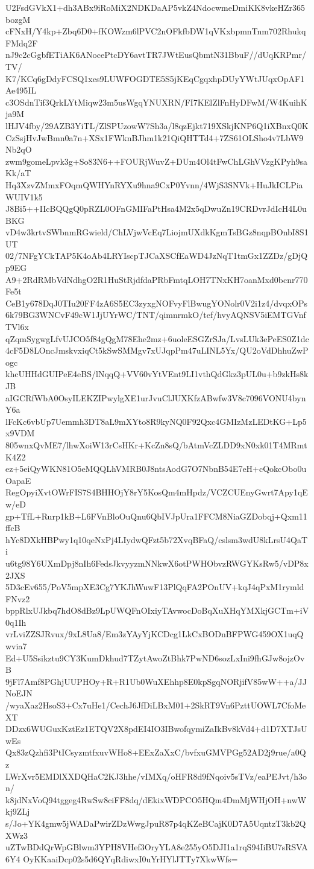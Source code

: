U2FsdGVkX1+dh3ABx9iRoMiX2NDKDaAP5vkZ4NdocwmeDmiKK8vkeHZr365bozgM
cFNxH/Y4kp+Zbq6D0+fKOWzm6lPVC2nOFkfbDW1qVKxbpmnTnm702RhukqFMdq2F
nJ9c2cGgbfETiAK6ANocePtcDY6avtTR7JWtEusQbmtN31BbuF//dUqKRPmr/TV/
K7/KCq6gDdyFCSQ1xes9LUWFOGDTE5S5jKEqCgqxhpDUyYWtJUqxOpAF1Ae495IL
c3OSdnTif3QrkLYtMiqw23m5usWgqYNUXRN/FI7KElZlFnHyDFwM/W4KuihKja9M
lHJV4fby/29AZB3YiTL/ZlSPUzowW7Sh3a/l8qzEjkt719XSkjKNP6Q1iXBnxQ0K
CzSsjHvJwBmn0a7n+XSx1FWknBJhm1k21QiQHTTd4+7ZS61OLSho4v7LbW9Nb2qO
zwm9gomeLpvk3g+So83N6++FOURjWuvZ+DUm4Ol4tFwChLGhVVzgKPyh9saKk/aT
Hq3XzvZMmxFOqmQWHYnRYXu9hna9CxP0Yvnn/4WjS3SNVk+HuJkICLPiaWUIV1k5
J8Bi5++IIcBQQgQ0pRZL0OFnGMIFaPtHsa4M2x5qDwuZn19CRDvrJdIcH4L0uBKG
vD4w3krtvSWbnmRGwield/ChLVjwVcEq7LiojmUXdkKgmTsBGz8nqpBOnbI8S1UT
02/7NFgYCkTAP5K4oAb4LRYIscpTJCaXSCfEaWD4JzNqT1tmGx1ZZDz/gDjQp9EG
A9+2RdRMbVdNdhgO2R1HuStRjdfdaPRbFmtqLOH7TNxKH7oanMxd0bcnr770Fe5t
CeB1y678DqJ0TIu20FF4zA6S5EC3zyxgNOFvyFlBwugYONolr0V2i1z4/dvqxOPs
6k79BG3WNCvF49cW1JjUYrWC/TNT/qimnrmkO/tef/hvyAQNSV5iEMTGVnfTVl6x
qZqmSygwgLfvUJCO5f84gQgM78Ehe2mz+6uoleESGZrSJa/LvsLUk3ePeES0Z1dc
4cF5D8LOncJmskvxiqCt5kSwSMMgv7xUJqpPm47uLINL5Yx/QU2oVdDhhuZwPogc
khcUHHdGUIPeE4eBS/lNqqQ+VV60vYtVEnt9LI1vthQdGkz3pUL0u+b9zkHs8kJB
aIGCRfWbA0OsyILEKZIPwylgXE1urJvuClJUXKfzABwfw3V8c7096VONU4bynY6a
lFcKc6vbUp7Uemmh3DT8aL9mXYto8R9kyNQ0F92Qxc4GMIzMzLEDtKG+Lp5x9VDM
805wnxQvME7/lhwXoiW13rCsHKr+KcZn8sQ/bAtmVcZLDD9xN0xk01T4MRmtK4Z2
ez+5eiQyWKN81O5eMQQLhVMRB0J8ntsAodG7O7NbnB54E7eH+cQokcObo0uOapaE
RegOpyiXvtOWrFIS7S4BHHOjY8rY5KosQm4mHpdz/VCZCUEnyGwrt7Apy1qEw/eD
gp+TfL+Rurp1kB+L6FVnBloOuQnu6QbIVJpUra1FFCM8NiaGZDobqj+Qxm11ffcB
hYc8DXkHBPwy1q10qeNxPj4LIydwQFzt5b72XvqBFaQ/cslsm3wdU8kLrsU4QaTi
u6tg98Y6UXmDpj8nIh6FedsJkvyyzmNNkwX6otPWHObvzRWGYKsRw5/vDP8x2JXS
5D3cEv655/PoV5mpXE3Cg7YKJhWuwF13PlQqFA2POnUV+kqJ4qPxM1rymldFNvz2
bppRlxUJkbq7hdO8dBz9LpUWQFnOIxiyTAvwocDoBqXuXHqYMXkjGCTm+iV0q1Ih
vrLviZZSJRvux/9xL8Ua8/Em3zYAyYjKCDcg1LkCxBODnBFPWG459OX1uqQwvia7
Ed+U5Ssikztu9CY3KumDkhud7TZytAwoZtBhk7PwND6sozLxIni9fhGJw8ojzOvB
9jFl7Amf8PGhjUUPHOy+R+R1Ub0WuXEhhp8E0kpSgqNORjifV85wW++a/JJNoEJN
/wyaXaz2HsoS3+Cx7uHe1/CechJ6JfDiLBxM01+2SkRT9Vn6PzttUOWL7CfoMeXT
DDzx6WUGuxKztEz1ETQV2X8pdEI4IO3IBwofqymiZaIkBv8kVd4+d1D7XTJsUwEs
Qx83zQzhfi3PtICsyzmtfxuvWHo8+EExZaXxC/bvfxuGMVPGg52AD2j9rue/a0Qz
LWrXvr5EMDlXXDQHaC2KJ3hhe/vIMXq/oHFR8d9fNqoiv5sTVz/eaPEJvt/h3on/
k8jdNxVoQ94tggeg4RwSw8ciFF8dq/dEkixWDPCO5HQm4DmMjWHjOH+nwWkj9ZLj
s/Jo+YK4gmw5jWADaPwirZDzWwgJpuR87p4qKZeBCajK0D7A5UqntzT3kb2QXWz3
uZTwBDdQrWpGBlwm3YPH8VHef3OryYLA8e255yO5DJI1a1rqS94IiBU7sRSVA6Y4
OyKKaaiDcp02s5d6QYqRdiwxI0uYrHYlJTTy7XkwWfs=
